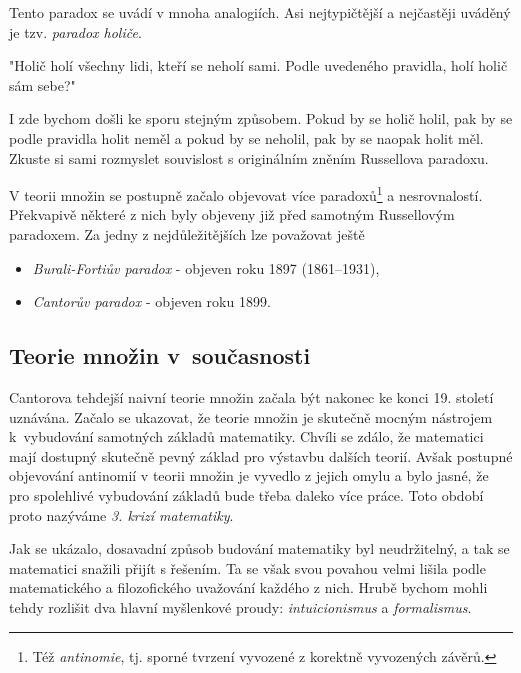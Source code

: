 Tento paradox se uvádí v mnoha analogiích. Asi nejtypičtější a nejčastěji uváděný je tzv. \emph{paradox holiče}.

"Holič holí všechny lidi, kteří se neholí sami. Podle uvedeného pravidla, holí holič sám sebe?"

I zde bychom došli ke sporu stejným způsobem. Pokud by se holič holil, pak by se podle pravidla holit neměl a pokud by se neholil, pak by se naopak holit měl. Zkuste si sami rozmyslet souvislost s originálním zněním Russellova paradoxu.\par
V teorii množin se postupně začalo objevovat více paradoxů\footnote{Též \emph{antinomie}, tj. sporné tvrzení vyvozené z korektně vyvozených závěrů.} a nesrovnalostí. Překvapivě některé z nich byly objeveny již před samotným Russellovým paradoxem. Za jedny z nejdůležitějších lze považovat ještě
\begin{itemize}
\item \emph{Burali-Fortiův paradox} - objeven roku 1897  (1861--1931),
\item \emph{Cantorův paradox} - objeven roku 1899.
\end{itemize}
\subsection{Teorie množin v~současnosti}
\label{subsec:tm_soucasnost}
Cantorova tehdejší naivní teorie množin začala být nakonec ke konci 19. století uznávána. Začalo se ukazovat, že teorie množin je skutečně mocným nástrojem k~vybudování samotných základů matematiky. Chvíli se zdálo, že matematici mají dostupný skutečně pevný základ pro výstavbu dalších teorií. Avšak postupné objevování antinomií v teorii množin je vyvedlo z jejich omylu a bylo jasné, že pro spolehlivé vybudování základů bude třeba daleko více práce. Toto období proto nazýváme \emph{3. krizí matematiky}.\par
Jak se ukázalo, dosavadní způsob budování matematiky byl neudržitelný, a tak se matematici snažili přijít s řešením. Ta se však svou povahou velmi lišila podle matematického a filozofického uvažování každého z nich. Hrubě bychom mohli tehdy rozlišit dva hlavní myšlenkové proudy: \emph{intuicionismus} a \emph{formalismus}.

